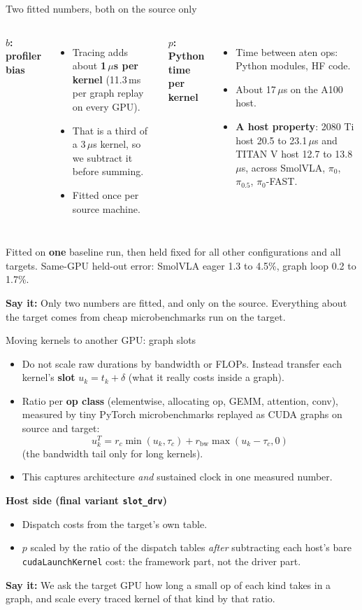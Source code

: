 \documentclass[aspectratio=169,10pt]{beamer}
\newcommand{\say}[1]{\par\vfill\noindent\colorbox{soft}{\parbox{\dimexpr\textwidth-2\fboxsep\relax}{\small\textbf{\textcolor{accent}{Say it:}} #1}}}
\begin{document}
\begin{frame}{Two fitted numbers, both on the source only}
\begin{columns}[T]
\textbf{$b$: profiler bias}
\begin{itemize}\small
\item Tracing adds about \textbf{1\,$\mu$s per kernel} (11.3\,ms per graph replay on every GPU).
\item That is a third of a 3\,$\mu$s kernel, so we subtract it before summing.
\item Fitted once per source machine.
\end{itemize}
\textbf{$p$: Python time per kernel}
\begin{itemize}\small
\item Time between aten ops: Python modules, HF code.
\item About 17\,$\mu$s on the A100 host.
\item \textbf{A host property}: 2080 Ti host 20.5 to 23.1\,$\mu$s and TITAN V host 12.7 to
  13.8\,$\mu$s, across SmolVLA, $\pi_0$, $\pi_{0.5}$, $\pi_0$-FAST.
\end{itemize}
\end{columns}
\vspace{0.8em}
Fitted on \textbf{one} baseline run, then held fixed for all other configurations and all
targets. Same-GPU held-out error: SmolVLA eager 1.3 to 4.5\%, graph loop 0.2 to 1.7\%.
\say{Only two numbers are fitted, and only on the source. Everything about the target comes
from cheap microbenchmarks run on the target.}
\end{frame}

\begin{frame}{Moving kernels to another GPU: graph slots}
\begin{itemize}
\item Do not scale raw durations by bandwidth or FLOPs. Instead transfer each kernel's
  \textbf{slot} $u_k = t_k + \delta$ (what it really costs inside a graph).
\item Ratio per \textbf{op class} (elementwise, allocating op, GEMM, attention, conv), measured
  by tiny PyTorch microbenchmarks replayed as CUDA graphs on source and target:
  \[u_k^T = r_c \min(u_k, \tau_c) + r_{\mathrm{bw}} \max(u_k - \tau_c, 0)\]
  (the bandwidth tail only for long kernels).
\item This captures architecture \emph{and} sustained clock in one measured number.
\end{itemize}
\textbf{Host side (final variant \texttt{slot\_drv})}
\begin{itemize}
\item Dispatch costs from the target's own table.
\item $p$ scaled by the ratio of the dispatch tables \emph{after} subtracting each host's bare
  \texttt{cudaLaunchKernel} cost: the framework part, not the driver part.
\end{itemize}
\say{We ask the target GPU how long a small op of each kind takes in a graph, and scale every
traced kernel of that kind by that ratio.}
\end{frame}
\end{document}
